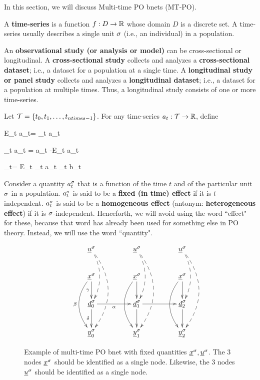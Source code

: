 In this section, we will
discuss Multi-time PO bnets (MT-PO).

A {\bf time-series} is a function $f:D\rightarrow { \mathbb{R}}$
whose domain $D$ is a discrete set. A time-series 
usually describes a single
unit $\sigma$ (i.e., an individual)
in a population.

An {\bf observational study (or analysis or model)}
can be cross-sectional or longitudinal.
A {\bf cross-sectional study} 
collects and analyzes a {\bf cross-sectional dataset};
i.e., a dataset for a population
at a single time. A {\bf longitudinal study
or panel study} collects and analyzes 
a {\bf longitudinal dataset};
i.e., a dataset for a population
at  multiple times. 
Thus, a longitudinal study 
consists of one or more time-series.

Let ${\cal T}=\{t_0, t_1, \ldots, t_{ntimes-1}\}$.
For any time-series $a_t: {\cal T}\rightarrow{ \mathbb{R}}$,
define

\beq
E_t a_t=
\sum_{t\in \calt} a_t
\eeq

\beq
\Delta_t a_t = a_t -E_t a_t
\eeq

\beq
{}_t= E_t \Delta_t a_t \Delta_t b_t
\eeq

Consider a quantity $a^\sigma_t$
that is a function of  the time $t$
and of the particular unit $\sigma$
in a population.
$a^\sigma_t$ is said to be a {\bf fixed (in time) effect} 
if it is $t$-independent.
$a^\sigma_t$ is said to be a
{\bf homogeneous effect}
(antonym: {\bf heterogeneous effect})
if it is
$\sigma$-independent.
Henceforth, we will avoid 
using the word ``effect" for these,
because that word
 has already been used for something else in
PO theory.
Instead, we will use the word ``quantity".

\begin{figure}[h!]
$$\xymatrix @C=4pc {
\rvu^\s\ar@/^1pc/@{-->}[dd]\ar@/^2pc/@{-->}[ddd]
&\rvu^\s\ar@/^1pc/@{-->}[dd]\ar@/^2pc/@{-->}[ddd]
&\rvu^\s\ar@/^1pc/@{-->}[dd]\ar@/^2pc/@{-->}[ddd]
\\
\rvx^\s\ar[d]_\gamma\ar@/_1.5pc/[dd]_\beta
&\rvx^\s\ar[d]\ar@/_1.5pc/[dd]
&\rvx^\s\ar[d]\ar@/_1.5pc/[dd]
\\
\rvd^\s_0\ar[d]_\delta\ar[r]_\alp
&\rvd^\s_1\ar[d]\ar[r]
&\rvd^\s_2\ar[d]
\\
\rvy^\s_0
&\rvy^\s_1
&\rvy^\s_2
}$$
\caption{Example 
of multi-time PO bnet
with fixed quantities ${\underline{x}}^\sigma, {\underline{u}}^\sigma$.
The 
3 nodes ${\underline{x}}^\sigma$
should be identified
as a single node. 
 Likewise, the 
3 nodes ${\underline{u}}^\sigma$
should be identified
as a single node. 
}
\label{fig-dynamic-po}
\end{figure}

